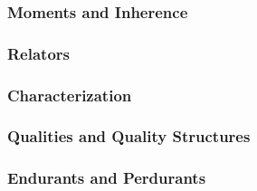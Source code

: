 \documentclass{article}
\newcommand{\BeginMomentsAndInherence}{985}
\newcommand{\EndMomentsAndInherence}{1055}
\newcommand{\BeginRelators}{1057}
\newcommand{\EndRelators}{1137}
\newcommand{\BeginCharacterization}{1139}
\newcommand{\EndCharacterization}{1156}
\newcommand{\BeginQualitiesAndQualityStructures}{1162}
\newcommand{\EndQualitiesAndQualityStructures}{1180}
\newcommand{\BeginEndurantsAndPerdurants}{1182}
\newcommand{\EndEndurantsAndPerdurants}{1201}
\begin{document}
\subsubsection{Moments and Inherence}



\subsubsection{Relators}



\subsubsection{Characterization}



\subsubsection{Qualities and Quality Structures}



\subsubsection{Endurants and Perdurants}



% 
% 
\end{document}
